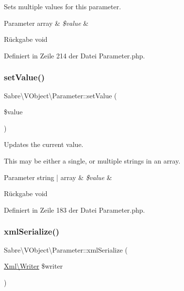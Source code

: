 Sets multiple values for this parameter.


\begin{DoxyParams}[1]{Parameter}
array & {\em \$value} & \\
\hline
\end{DoxyParams}
\begin{DoxyReturn}{Rückgabe}
void 
\end{DoxyReturn}


Definiert in Zeile 214 der Datei Parameter.\+php.

\mbox{\label{class_sabre_1_1_v_object_1_1_parameter_ad7f8012aa4f4de86c93784c1710e4006}} 
\subsubsection{\texorpdfstring{set\+Value()}{setValue()}}
{\footnotesize\ttfamily Sabre\textbackslash{}\+V\+Object\textbackslash{}\+Parameter\+::set\+Value (\begin{DoxyParamCaption}\item[{}]{\$value }\end{DoxyParamCaption})}

Updates the current value.

This may be either a single, or multiple strings in an array.


\begin{DoxyParams}[1]{Parameter}
string | array & {\em \$value} & \\
\hline
\end{DoxyParams}
\begin{DoxyReturn}{Rückgabe}
void 
\end{DoxyReturn}


Definiert in Zeile 183 der Datei Parameter.\+php.

\mbox{\label{class_sabre_1_1_v_object_1_1_parameter_a3b34be686007dc4a97190ae2d91ead27}} 
\subsubsection{\texorpdfstring{xml\+Serialize()}{xmlSerialize()}}
{\footnotesize\ttfamily Sabre\textbackslash{}\+V\+Object\textbackslash{}\+Parameter\+::xml\+Serialize (\begin{DoxyParamCaption}\item[{\mbox{\hyperlink{class_sabre_1_1_xml_1_1_writer}{Xml\textbackslash{}\+Writer}}}]{\$writer }\end{DoxyParamCaption})}

